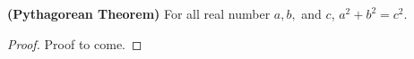\guard

\begin{thm}
\label{thm:PythagoreanTheorem}
  \textbf{(Pythagorean Theorem)}
  For all real number $a,b,$ and $c$, $a^2+b^2=c^2$.
\end{thm}
\begin{proof}
  Proof to come.
\end{proof}
